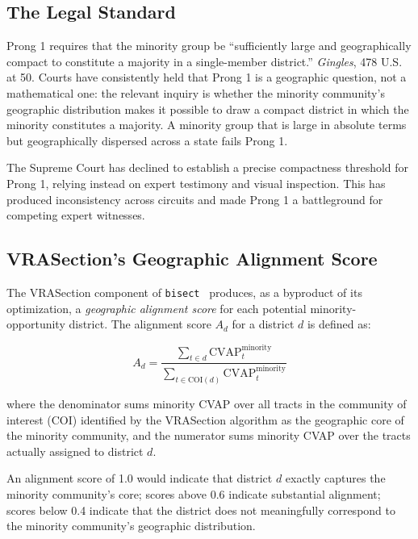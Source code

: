 \label{sec:prong1}

\subsection{The Legal Standard}

Prong 1 requires that the minority group be ``sufficiently large and
geographically compact to constitute a majority in a single-member district.''
\textit{Gingles}, 478 U.S. at 50.  Courts have consistently held that Prong 1
is a geographic question, not a mathematical one: the relevant inquiry is
whether the minority community's geographic distribution makes it possible to
draw a compact district in which the minority constitutes a majority.  A
minority group that is large in absolute terms but geographically dispersed
across a state fails Prong 1.

The Supreme Court has declined to establish a precise compactness threshold
for Prong 1, relying instead on expert testimony and visual inspection.
This has produced inconsistency across circuits and made Prong 1 a battleground
for competing expert witnesses.

\subsection{VRASection's Geographic Alignment Score}

The VRASection component of \texttt{bisect}~\citep{dellaLibera2026vra}
produces, as a byproduct of its optimization, a \emph{geographic alignment
score} for each potential minority-opportunity district.  The alignment score
$A_d$ for a district $d$ is defined as:

\begin{equation}
  A_d = \frac{\sum_{t \in d} \text{CVAP}^{\text{minority}}_t}
             {\sum_{t \in \text{COI}(d)} \text{CVAP}^{\text{minority}}_t}
\end{equation}

where the denominator sums minority CVAP over all tracts in the community of
interest (COI) identified by the VRASection algorithm as the geographic core
of the minority community, and the numerator sums minority CVAP over the
tracts actually assigned to district $d$.

An alignment score of 1.0 would indicate that district $d$ exactly captures
the minority community's core; scores above 0.6 indicate substantial alignment;
scores below 0.4 indicate that the district does not meaningfully correspond
to the minority community's geographic distribution.

